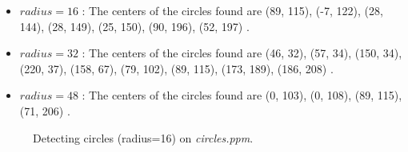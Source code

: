 \documentclass[paper=a4, fontsize=11pt]{scrartcl}
\numberwithin{equation}{section}		%
\numberwithin{figure}{section}			%
\begin{document}
\begin{itemize}
\item $ radius = 16 $ : The centers of the circles found are (89, 115), (-7, 122), (28, 144), (28, 149), (25, 150), (90, 196), (52, 197) .
\item $ radius = 32 $ : The centers of the circles found are (46, 32), (57, 34), (150, 34), (220, 37), (158, 67), (79, 102), (89, 115), (173, 189), (186, 208) .
\item $ radius = 48 $ : The centers of the circles found are  (0, 103), 
(0, 108), (89, 115), (71, 206) .
\end{itemize}



\begin{figure}[h]
\centering
{}
\caption{Detecting circles (radius=16) on \emph{circles.ppm}.}
\label{fig:hough:circle:16}
\end{figure}
\end{document}
